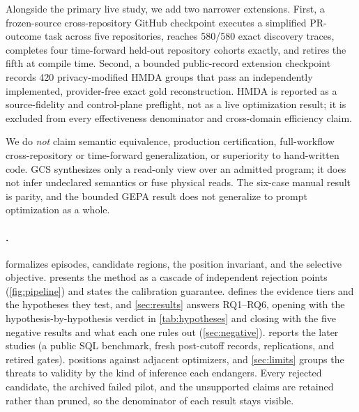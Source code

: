 Alongside the primary live study, we add two narrower extensions.  First, a frozen-source
cross-repository GitHub checkpoint executes a simplified PR-outcome task across five
repositories, reaches 580/580 exact discovery traces, completes four time-forward
held-out repository cohorts exactly, and retires the fifth at compile time.  Second, a
bounded public-record extension checkpoint records 420 privacy-modified HMDA groups that
pass an independently implemented, provider-free exact gold reconstruction.  HMDA is
reported as a source-fidelity and control-plane preflight, not as a live optimization
result; it is excluded from every effectiveness denominator and cross-domain efficiency
claim.

We do \emph{not} claim semantic equivalence, production certification, full-workflow
cross-repository or time-forward generalization, or superiority to hand-written code.
GCS synthesizes only a read-only view over an admitted program; it does not infer
undeclared semantics or fuse physical reads.
The six-case manual result is parity, and the bounded GEPA result does not generalize to
prompt optimization as a whole.

\paragraph{\reportstructurelabel.}
 formalizes episodes, candidate regions, the position invariant, and the
selective objective.   presents the method as a cascade of independent
rejection points (\cref{fig:pipeline}) and states the calibration guarantee.
 defines the evidence tiers and the hypotheses they test, and
\cref{sec:results} answers RQ1--RQ6, opening with the hypothesis-by-hypothesis
verdict in \cref{tab:hypotheses} and closing with the five negative results and what each
one rules out (\cref{sec:negative}).   reports the later studies (a public SQL
benchmark, fresh post-cutoff records, replications, and retired gates).   positions \method against adjacent
optimizers, and \cref{sec:limits} groups the threats to validity by the kind of inference
each endangers.  Every rejected candidate, the archived failed pilot, and the unsupported
claims are retained rather than pruned, so the denominator of each result stays visible.

